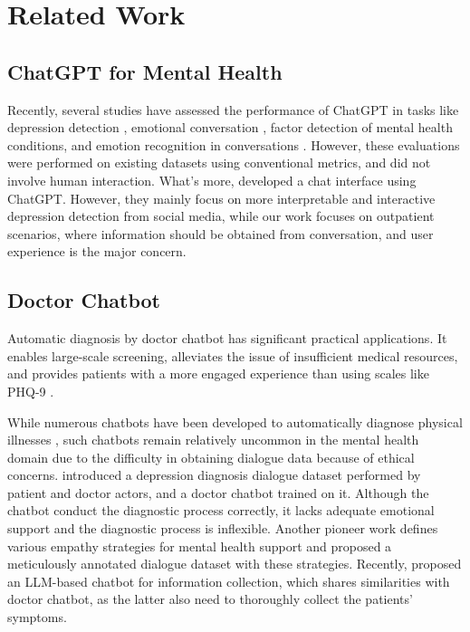 \section{Related Work}
\label{sec:related}

\subsection{ChatGPT for Mental Health}
Recently, several studies have assessed the performance of ChatGPT in tasks like depression detection \cite{lamichhane2023evaluation}, emotional conversation \cite{zhao2023chatgpt}, factor detection of mental health conditions, and emotion recognition in conversations \cite{yang2023evaluations}. However, these evaluations were performed on existing datasets using conventional metrics, and did not involve human interaction. What's more, \citet{qin2023read} developed a chat interface using ChatGPT.  
However, they mainly focus on more interpretable and interactive depression detection from social media, while our work focuses on outpatient scenarios, where information should be obtained from conversation, and user experience is the major concern.

\subsection{Doctor Chatbot}
Automatic diagnosis by doctor chatbot has significant practical applications. It enables large-scale screening, alleviates the issue of insufficient medical resources, and provides patients with a more engaged experience than using scales like PHQ-9 \cite{kroenke2001phq}.

While numerous chatbots have been developed to automatically diagnose physical illnesses \cite{Xu2019End, wei2018task}, such chatbots remain relatively uncommon in the mental health domain due to the difficulty in obtaining dialogue data because of ethical concerns. \citet{yao-etal-2022-d4} introduced a depression diagnosis dialogue dataset performed by patient and doctor actors, and a doctor chatbot trained on it. Although the chatbot conduct the diagnostic process correctly, it lacks adequate emotional support and the diagnostic process is inflexible. Another pioneer work \cite{liu2021towards} defines various empathy strategies for mental health support and proposed a meticulously annotated dialogue dataset with these strategies. Recently, \citet{wei2023leveraging} proposed an LLM-based chatbot for information collection, which shares similarities with doctor chatbot, as the latter also need to thoroughly collect the patients' symptoms. 

